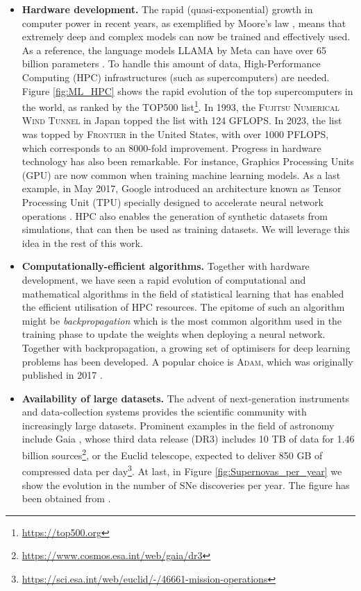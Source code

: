 \begin{itemize}
    \item \textbf{Hardware development.} The rapid (quasi-exponential) growth in computer power in recent years, as exemplified by Moore's law \cite{Moor_law}, means that extremely deep and complex models can now be trained and effectively used. As a reference, the language models \textsc{LLAMA} by Meta can have over 65 billion parameters \cite{Llama}. To handle this amount of data, High-Performance Computing (HPC) infrastructures (such as supercomputers) are needed. Figure \ref{fig:ML_HPC} shows the rapid evolution of the top supercomputers in the world, as ranked by the TOP500 list\footnote{\url{https://top500.org}}. In 1993, the \textsc{Fujitsu Numerical Wind Tunnel} in Japan topped the list with 124 GFLOPS. In 2023, the list was topped by \textsc{Frontier} in the United States, with over 1000 PFLOPS, which corresponds to an 8000-fold improvement. Progress in hardware technology has also been remarkable. For instance, Graphics Processing Units (GPU) are now common when training machine learning models. As a last example, in May 2017, Google introduced an architecture known as Tensor Processing Unit (TPU) specially designed to accelerate neural network operations \cite{TPU}. HPC also enables the generation of synthetic datasets from simulations, that can then be used as training datasets. We will leverage this idea in the rest of this work.


    \item \textbf{Computationally-efficient algorithms.} Together with hardware development, we have seen a rapid evolution of computational and mathematical algorithms in the field of statistical learning that has enabled the efficient utilisation of HPC resources. The epitome of such an algorithm might be \emph{backpropagation} \cite{backprop} which is the most common algorithm used in the training phase to update the weights when deploying a neural network. Together with backpropagation, a growing set of optimisers for deep learning problems has been developed. A popular choice is \textsc{Adam}, which was originally published in 2017 \cite{adam}.

    \item \textbf{Availability of large datasets.} The advent of next-generation instruments and data-collection systems provides the scientific community with increasingly large datasets. Prominent examples in the field of astronomy include Gaia \cite{gaia}, whose third data release (DR3) includes 10 TB of data for 1.46 billion sources\footnote{\url{https://www.cosmos.esa.int/web/gaia/dr3}}, or the Euclid telescope, expected to deliver 850 GB of compressed data per day\footnote{\url{https://sci.esa.int/web/euclid/-/46661-mission-operations}}. At last, in Figure \ref{fig:Supernovas_per_year} we show the evolution in the number of SNe discoveries per year. The figure has been obtained from \cite{SN_year}.



    
\end{itemize}

